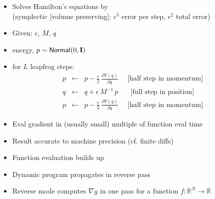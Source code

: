 \documentclass[10pt]{report}
\begin{document}
%
\begin{itemize}
\item Solves Hamilton's equations by 
  \\
  {\footnotesize (symplectic [volume preserving]; $\epsilon^3$ error per step, $\epsilon^2$ total error)}
\item Given:  $\epsilon$,  $M$,  $q$
\item {} energy, $p \sim {\sf
    Normal}(0,\mbox{\bf I})$
\item {} for $L$ leapfrog steps:
  \begin{eqnarray*}
    p & \leftarrow &
    p - \frac{\epsilon}{2} \, \frac{\partial V(q)}{\partial q}
    \ \ \ \ \ \ \mbox{[half step in momentum]}
    \\[6pt]
    q & \leftarrow &
    q + \epsilon \, M^{-1} \, p
    \ \ \ \ \ \ \ \  \mbox{[full step in position]}
    \\[6pt]
    p & \leftarrow &
    p - \frac{\epsilon}{2} \, \frac{\partial V(q)}{\partial q}
    \ \ \ \ \ \ \mbox{[half step in momentum]}
  \end{eqnarray*}
\end{itemize}


%
\begin{itemize}
\item Eval gradient in (usually small) multiple of function eval time
%
\item Result accurate to machine precision (cf. finite diffs)
\item Function evaluation builds up 
\item Dynamic program propagates  in reverse pass
\item Reverse mode computes $\nabla g$ in one
  pass for a function $f : \mathbb{R}^N \rightarrow \mathbb{R}$
\end{itemize}
\end{document}
